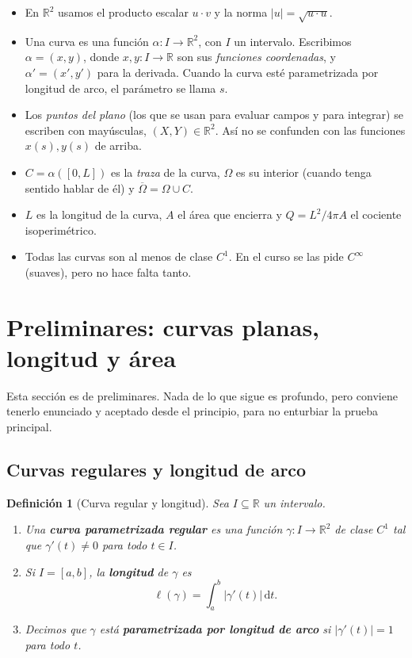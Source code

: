 \documentclass[12pt,a4paper]{article}
\theoremstyle{profesional}
\theoremstyle{definicion-style}
\newtheorem{definicion}[teorema]{Definición}
\newcommand{\R}{\mathbb{R}}
\newcommand{\abs}[1]{\left| #1 \right|}
\begin{document}
\begin{itemize}[leftmargin=2em]
    \item En \( \R^2 \) usamos el producto escalar \( u \cdot v \) y la norma \( \abs{u} = \sqrt{u \cdot u} \).
    \item Una curva es una función \( \alpha : I \to \R^2 \), con \( I \) un intervalo. Escribimos \( \alpha = (x, y) \), donde \( x, y : I \to \R \) son sus \emph{funciones coordenadas}, y \( \alpha' = (x', y') \) para la derivada.
          Cuando la curva esté parametrizada por longitud de arco, el parámetro se llama \( s \).
    \item Los \emph{puntos del plano} (los que se usan para evaluar campos y para integrar) se escriben con mayúsculas, \( (X, Y) \in \R^2 \). Así no se confunden con las funciones \( x(s), y(s) \) de arriba.
    \item \( C = \alpha([0, L]) \) es la \emph{traza} de la curva, \( \Omega \) es su interior (cuando tenga sentido hablar de él) y \( \overline{\Omega} = \Omega \cup C \).
    \item \( L \) es la longitud de la curva, \( A \) el área que encierra y \( Q = L^2/4\pi A \) el cociente isoperimétrico.
    \item Todas las curvas son al menos de clase \( C^1 \). En el curso se las pide \( C^\infty \) (suaves), pero no hace falta tanto.
\end{itemize}

\newpage
\section{Preliminares: curvas planas, longitud y área}\label{sec:curvas}

Esta sección es de preliminares. Nada de lo que sigue es profundo, pero conviene tenerlo enunciado y aceptado desde el principio, para no enturbiar la prueba principal.

\subsection{Curvas regulares y longitud de arco}

\begin{definicion}[Curva regular y longitud]
    Sea \( I \subseteq \R \) un intervalo.
    \begin{enumerate}[label=\arabic*.]
        \item Una \textbf{curva parametrizada regular} es una función \( \gamma : I \to \R^2 \) de clase \( C^1 \) tal que \( \gamma'(t) \neq 0 \) para todo \( t \in I \).
        \item Si \( I = [a, b] \), la \textbf{longitud} de \( \gamma \) es
              \[
                  \ell(\gamma) = \int_a^b \abs{\gamma'(t)} \, \mathrm{d}t.
              \]
        \item Decimos que \( \gamma \) está \textbf{parametrizada por longitud de arco} si \( \abs{\gamma'(t)} = 1 \) para todo \( t \).
    \end{enumerate}
\end{definicion}
\end{document}
